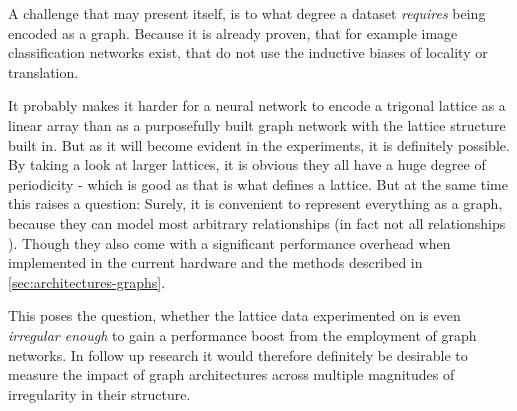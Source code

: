 A challenge that may present itself, is to what degree a dataset \emph{requires} being encoded as a graph.
Because it is already proven, that for example image classification networks exist, that do not use the inductive biases of locality or translation. 

It probably makes it harder for a neural network to encode a trigonal lattice as a linear array than as a purposefully built graph network with the lattice structure built in.
But as it will become evident in the experiments, it is definitely possible. 
By taking a look at larger lattices, it is obvious they all have a huge degree of periodicity - which is good as that is what defines a lattice.
But at the same time this raises a question: Surely, it is convenient to represent everything as a graph, because they can model most arbitrary relationships (in fact not all relationships \cite{relationalInductiveBiasesAndGraphNetworks}). 
Though they also come with a significant performance overhead when implemented in the current hardware and the methods described in \autoref{sec:architectures-graphs}. 

This poses the question, whether the lattice data experimented on is even \emph{irregular enough} to gain a performance boost from the employment of graph networks.
In follow up research it would therefore definitely be desirable to measure the impact of graph architectures across multiple magnitudes of \glqq irregularity\grqq{} in their structure.
